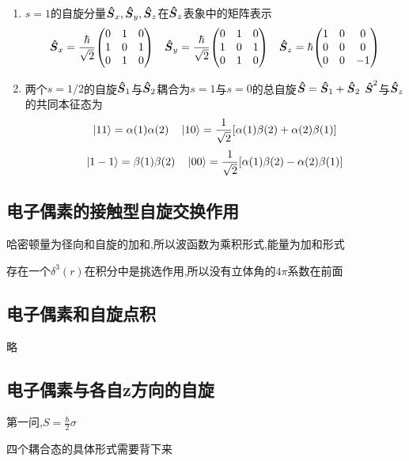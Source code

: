 \documentclass{article}
\begin{document}
\begin{formal}
\begin{enumerate}
            \item $ s = 1 $的自旋分量$ \vu*{S}_{x} , \vu*{S}_{y} , \vu*{S}_{z} $在$\vu*{S}_{z}$表象中的矩阵表示
                  $$
                  \vu*{S}_{x} = \frac{\hbar}{\sqrt{2}} \mqty(0 & 1 & 0 \\ 1 & 0 & 1 \\ 0 & 1 & 0) \quad 
                  \vu*{S}_{y} = \frac{\hbar}{\sqrt{2}} \mqty(0 & 1 & 0 \\ 1 & 0 & 1 \\ 0 & 1 & 0) \quad
                  \vu*{S}_{z} = \hbar \mqty(1 & 0 & 0 \\ 0 & 0 & 0 \\ 0 & 0 & -1) 
                  $$

            \item 两个$s=1/2$的自旋$\vu*{S}_{1}$与$\vu*{S}_{2}$耦合为$s=1$与$s=0$的总自旋$\vu*{S} = \vu*{S}_{1}+\vu*{S}_{2}$
                  $\vu*{S}^{2}$与$\vu*{S}_{z}$的共同本征态为
                  $$
                  \ket{11} = \alpha(1)\alpha(2) \quad \ket{10} = \frac{1}{\sqrt{2}}[\alpha(1)\beta(2) + \alpha(2) \beta(1)]
                  $$
                  $$
                  \ket{1-1} = \beta(1)\beta(2) \quad \ket{00} = \frac{1}{\sqrt{2}}[\alpha(1)\beta(2) - \alpha(2)\beta(1)]
                  $$

        \end{enumerate}
        \end{formal}



        \subsection{电子偶素的接触型自旋交换作用}
            哈密顿量为径向和自旋的加和,所以波函数为乘积形式,能量为加和形式

            存在一个$\delta^{3}(r)$在积分中是挑选作用,所以没有立体角的$4\pi$系数在前面

        \subsection{电子偶素和自旋点积}
            略

        \subsection{电子偶素与各自z方向的自旋}
            第一问,$ S = \frac{\hbar}{2} \sigma $

            四个耦合态的具体形式需要背下来
\end{document}
